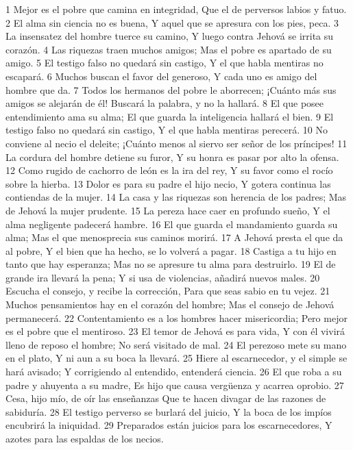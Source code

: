 1 Mejor es el pobre que camina en integridad,
Que el de perversos labios y fatuo.
2 El alma sin ciencia no es buena,
Y aquel que se apresura con los pies, peca.
3 La insensatez del hombre tuerce su camino,
Y luego contra Jehová se irrita su corazón.
4 Las riquezas traen muchos amigos;
Mas el pobre es apartado de su amigo.
5 El testigo falso no quedará sin castigo,
Y el que habla mentiras no escapará.
6 Muchos buscan el favor del generoso,
Y cada uno es amigo del hombre que da.
7 Todos los hermanos del pobre le aborrecen;
¡Cuánto más sus amigos se alejarán de él!
Buscará la palabra, y no la hallará.
8 El que posee entendimiento ama su alma;
El que guarda la inteligencia hallará el bien.
9 El testigo falso no quedará sin castigo,
Y el que habla mentiras perecerá.
10 No conviene al necio el deleite;
¡Cuánto menos al siervo ser señor de los príncipes!
11 La cordura del hombre detiene su furor,
Y su honra es pasar por alto la ofensa.
12 Como rugido de cachorro de león es la ira del rey,
Y su favor como el rocío sobre la hierba.
13 Dolor es para su padre el hijo necio,
Y gotera continua las contiendas de la mujer.
14 La casa y las riquezas son herencia de los padres;
Mas de Jehová la mujer prudente.
15 La pereza hace caer en profundo sueño,
Y el alma negligente padecerá hambre.
16 El que guarda el mandamiento guarda su alma;
Mas el que menosprecia sus caminos morirá.
17 A Jehová presta el que da al pobre,
Y el bien que ha hecho, se lo volverá a pagar.
18 Castiga a tu hijo en tanto que hay esperanza; 
Mas no se apresure tu alma para destruirlo.
19 El de grande ira llevará la pena;
Y si usa de violencias, añadirá nuevos males.
20 Escucha el consejo, y recibe la corrección,
Para que seas sabio en tu vejez. 
21 Muchos pensamientos hay en el corazón del hombre;
Mas el consejo de Jehová permanecerá. 
22 Contentamiento es a los hombres hacer misericordia;
Pero mejor es el pobre que el mentiroso.
23 El temor de Jehová es para vida,
Y con él vivirá lleno de reposo el hombre;
No será visitado de mal.
24 El perezoso mete su mano en el plato,
Y ni aun a su boca la llevará.
25 Hiere al escarnecedor, y el simple se hará avisado;
Y corrigiendo al entendido, entenderá ciencia.
26 El que roba a su padre y ahuyenta a su madre,
Es hijo que causa vergüenza y acarrea oprobio.
27 Cesa, hijo mío, de oír las enseñanzas
Que te hacen divagar de las razones de sabiduría.
28 El testigo perverso se burlará del juicio,
Y la boca de los impíos encubrirá la iniquidad.
29 Preparados están juicios para los escarnecedores,
Y azotes para las espaldas de los necios.

